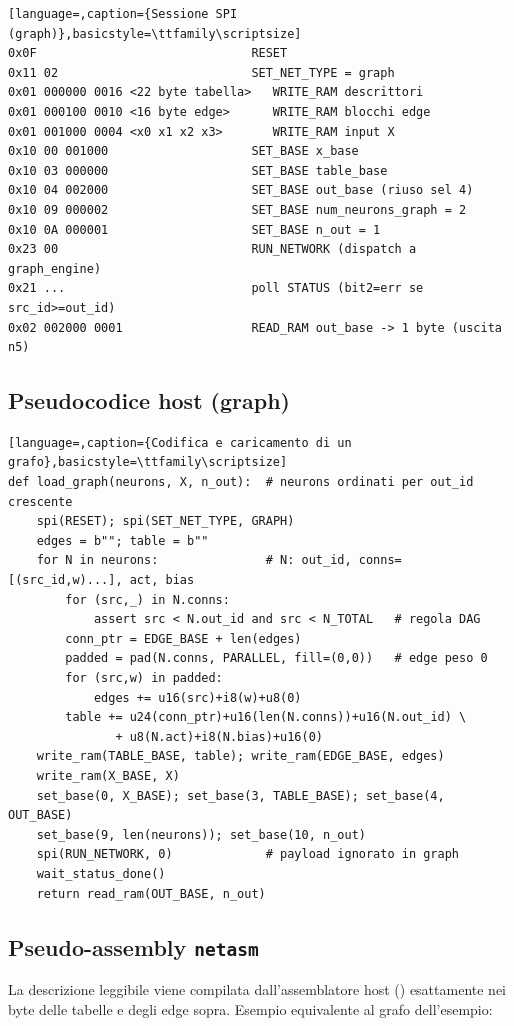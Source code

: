 \begin{lstlisting}[language=,caption={Sessione SPI (graph)},basicstyle=\ttfamily\scriptsize]
0x0F                              RESET
0x11 02                           SET_NET_TYPE = graph
0x01 000000 0016 <22 byte tabella>   WRITE_RAM descrittori
0x01 000100 0010 <16 byte edge>      WRITE_RAM blocchi edge
0x01 001000 0004 <x0 x1 x2 x3>       WRITE_RAM input X
0x10 00 001000                    SET_BASE x_base
0x10 03 000000                    SET_BASE table_base
0x10 04 002000                    SET_BASE out_base (riuso sel 4)
0x10 09 000002                    SET_BASE num_neurons_graph = 2
0x10 0A 000001                    SET_BASE n_out = 1
0x23 00                           RUN_NETWORK (dispatch a graph_engine)
0x21 ...                          poll STATUS (bit2=err se src_id>=out_id)
0x02 002000 0001                  READ_RAM out_base -> 1 byte (uscita n5)
\end{lstlisting}

\subsection{Pseudocodice host (graph)}
\begin{lstlisting}[language=,caption={Codifica e caricamento di un grafo},basicstyle=\ttfamily\scriptsize]
def load_graph(neurons, X, n_out):  # neurons ordinati per out_id crescente
    spi(RESET); spi(SET_NET_TYPE, GRAPH)
    edges = b""; table = b""
    for N in neurons:               # N: out_id, conns=[(src_id,w)...], act, bias
        for (src,_) in N.conns:
            assert src < N.out_id and src < N_TOTAL   # regola DAG
        conn_ptr = EDGE_BASE + len(edges)
        padded = pad(N.conns, PARALLEL, fill=(0,0))   # edge peso 0
        for (src,w) in padded:
            edges += u16(src)+i8(w)+u8(0)
        table += u24(conn_ptr)+u16(len(N.conns))+u16(N.out_id) \
               + u8(N.act)+i8(N.bias)+u16(0)
    write_ram(TABLE_BASE, table); write_ram(EDGE_BASE, edges)
    write_ram(X_BASE, X)
    set_base(0, X_BASE); set_base(3, TABLE_BASE); set_base(4, OUT_BASE)
    set_base(9, len(neurons)); set_base(10, n_out)
    spi(RUN_NETWORK, 0)             # payload ignorato in graph
    wait_status_done()
    return read_ram(OUT_BASE, n_out)
\end{lstlisting}

\subsection{Pseudo-assembly \texttt{netasm}}
La descrizione leggibile viene compilata dall'assemblatore host ()
esattamente nei byte delle tabelle e degli edge sopra. Esempio equivalente al grafo
dell'esempio:

